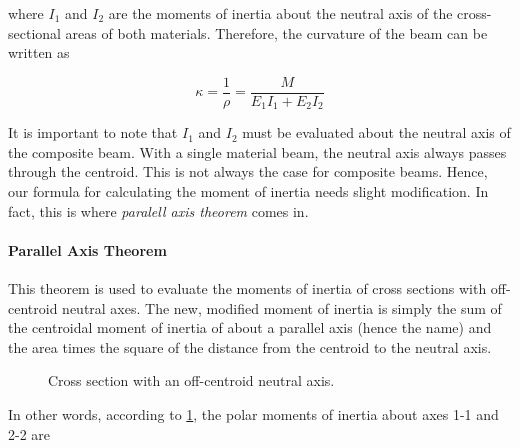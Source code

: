 \documentclass[
10pt,
a4paper,
openany,
svgnames,
]{book} %
\begin{document}
where $I_1$ and $I_2$ are the moments of inertia about the neutral axis of the cross-sectional areas of both materials. Therefore, the curvature of the beam can be written as

\begin{equation}
  \kappa  = \frac{1}{\rho } = \frac{M}{E_1I_1 + E_2I_2}
\end{equation}

It is important to note that $I_1$ and $I_2$ must be evaluated about the neutral axis of the composite beam. With a single material beam, the neutral axis always passes through the centroid. This is not always the case for composite beams. Hence, our formula for calculating the moment of inertia needs slight modification. In fact, this is where \emph{paralell axis theorem} comes in.

\paragraph{Parallel Axis Theorem}

This theorem is used to evaluate the moments of inertia of cross sections with off-centroid neutral axes. The new, modified moment of inertia is simply the sum of the centroidal moment of inertia of about a parallel axis (hence the name) and the area times the square of the distance from the centroid to the neutral axis.

\begin{figure}[h]
  \centering
  \caption{Cross section with an off-centroid neutral axis.}
  \label{fig: parallel axis theorem}
\end{figure}

In other words, according to \cref{fig: parallel axis theorem}, the polar moments of inertia about axes 1-1 and 2-2 are
\end{document}
